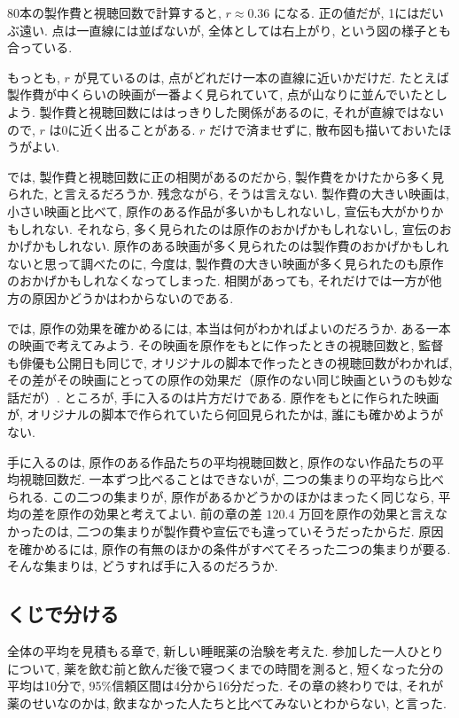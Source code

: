     80本の製作費と視聴回数で計算すると, $r \approx 0.36$ になる.
    正の値だが, 1にはだいぶ遠い.
    点は一直線には並ばないが, 全体としては右上がり, という図の様子とも合っている.

    もっとも, $r$ が見ているのは, 点がどれだけ一本の直線に近いかだけだ.
    たとえば製作費が中くらいの映画が一番よく見られていて, 点が山なりに並んでいたとしよう.
    製作費と視聴回数にははっきりした関係があるのに, それが直線ではないので, $r$ は0に近く出ることがある.
    $r$ だけで済ませずに, 散布図も描いておいたほうがよい.

    では, 製作費と視聴回数に正の相関があるのだから, 製作費をかけたから多く見られた, と言えるだろうか.
    残念ながら, そうは言えない.
    製作費の大きい映画は, 小さい映画と比べて, 原作のある作品が多いかもしれないし, 宣伝も大がかりかもしれない.
    それなら, 多く見られたのは原作のおかげかもしれないし, 宣伝のおかげかもしれない.
    原作のある映画が多く見られたのは製作費のおかげかもしれないと思って調べたのに, 今度は, 製作費の大きい映画が多く見られたのも原作のおかげかもしれなくなってしまった.
    相関があっても, それだけでは一方が他方の原因かどうかはわからないのである.

    では, 原作の効果を確かめるには, 本当は何がわかればよいのだろうか.
    ある一本の映画で考えてみよう.
    その映画を原作をもとに作ったときの視聴回数と, 監督も俳優も公開日も同じで, オリジナルの脚本で作ったときの視聴回数がわかれば, その差がその映画にとっての原作の効果だ（原作のない同じ映画というのも妙な話だが）.
    ところが, 手に入るのは片方だけである.
    原作をもとに作られた映画が, オリジナルの脚本で作られていたら何回見られたかは, 誰にも確かめようがない.

    手に入るのは, 原作のある作品たちの平均視聴回数と, 原作のない作品たちの平均視聴回数だ.
    一本ずつ比べることはできないが, 二つの集まりの平均なら比べられる.
    この二つの集まりが, 原作があるかどうかのほかはまったく同じなら, 平均の差を原作の効果と考えてよい.
    前の章の差 $120.4$ 万回を原作の効果と言えなかったのは, 二つの集まりが製作費や宣伝でも違っていそうだったからだ.
    原因を確かめるには, 原作の有無のほかの条件がすべてそろった二つの集まりが要る.
    そんな集まりは, どうすれば手に入るのだろうか.

  \subsection{くじで分ける}

    全体の平均を見積もる章で, 新しい睡眠薬の治験を考えた.
    参加した一人ひとりについて, 薬を飲む前と飲んだ後で寝つくまでの時間を測ると, 短くなった分の平均は10分で, 95\%信頼区間は4分から16分だった.
    その章の終わりでは, それが薬のせいなのかは, 飲まなかった人たちと比べてみないとわからない, と言った.

